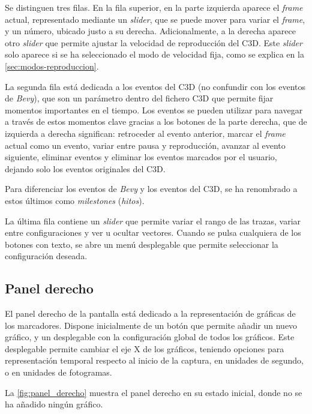 Se distinguen tres filas. En la fila superior, en la parte izquierda aparece el \textit{frame} actual, representado mediante un \textit{slider}, que se puede mover para variar el \textit{frame}, y un número, ubicado justo a su derecha. Adicionalmente, a la derecha aparece otro \textit{slider} que permite ajustar la velocidad de reproducción del \ac{C3D}. Este \textit{slider} solo aparece si se ha seleccionado el modo de velocidad fija, como se explica en la \autoref{sec:modos-reproduccion}.

La segunda fila está dedicada a los eventos del \ac{C3D} (no confundir con los eventos de \textit{Bevy}), que son un parámetro dentro del fichero \ac{C3D} que permite fijar momentos importantes en el tiempo. Los eventos se pueden utilizar para navegar a través de estos momentos clave gracias a los botones de la parte derecha, que de izquierda a derecha significan: retroceder al evento anterior, marcar el \textit{frame} actual como un evento, variar entre pausa y reproducción, avanzar al evento siguiente, eliminar eventos y eliminar los eventos marcados por el usuario, dejando solo los eventos originales del \ac{C3D}.

Para diferenciar los eventos de \textit{Bevy} y los eventos del \ac{C3D}, se ha renombrado a estos últimos como \textit{milestones} (\textit{hitos}).

La última fila contiene un \textit{slider} que permite variar el rango de las trazas, variar entre configuraciones y ver u ocultar vectores. Cuando se pulsa cualquiera de los botones con texto, se abre un menú desplegable que permite seleccionar la configuración deseada.

\subsection{Panel derecho} \label{sec:panel-derecho}
El panel derecho de la pantalla está dedicado a la representación de gráficas de los marcadores. Dispone inicialmente de un botón que permite añadir un nuevo gráfico, y un desplegable con la configuración global de todos los gráficos. Este desplegable permite cambiar el eje X de los gráficos, teniendo opciones para representación temporal respecto al inicio de la captura, en unidades de segundo, o en unidades de fotogramas.

La \autoref{fig:panel_derecho} muestra el panel derecho en su estado inicial, donde no se ha añadido ningún gráfico. 

